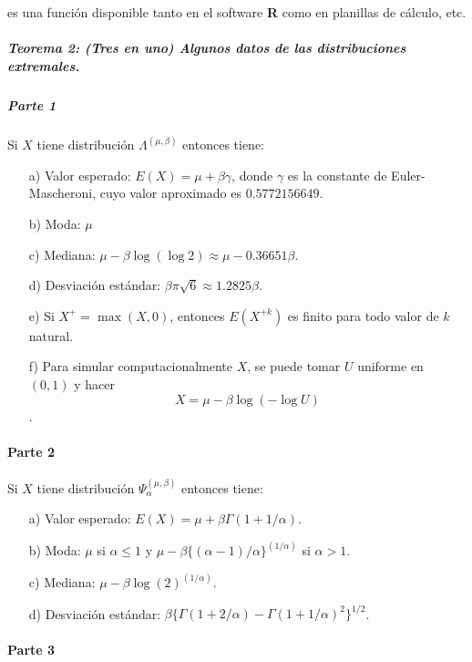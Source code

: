 \documentclass[
  oneside]{article}
\begin{document}
es una función disponible tanto en el software \textbf{R} como en
planillas de cálculo, etc.

\hypertarget{teorema-2-tres-en-uno-algunos-datos-de-las-distribuciones-extremales.}{%
\subparagraph{Teorema 2: (Tres en uno) Algunos datos de las
distribuciones
extremales.}\label{teorema-2-tres-en-uno-algunos-datos-de-las-distribuciones-extremales.}}

\hypertarget{parte-1}{%
\subparagraph{Parte 1}\label{parte-1}}

Si \(X\) tiene distribución \(\Lambda^{(\mu,\beta)}\) entonces tiene:

\begin{itemize}
  \item[a)] Valor esperado: $E(X) = \mu + \beta\gamma$, donde $\gamma$ es la constante de Euler-Mascheroni, cuyo valor aproximado es $0.5772156649$.
  \item[b)] Moda: $\mu$
  \item[c)] Mediana: $\mu - \beta \log(\log 2) \approx \mu - 0.36651 \beta$.
  \item[d)] Desviación estándar: $\beta \pi \sqrt{6} \approx 1.2825 \beta$.
  \item[e)] Si $X^+ = \max(X,0)$, entonces $E(X^{+k})$ es finito para todo valor de $k$ natural.
  \item[f)] Para simular computacionalmente $X$, se puede tomar $U$ uniforme en $(0,1)$ y hacer $$X = \mu - \beta \log(-\log U)$$.
\end{itemize}

\hypertarget{parte-2}{%
\paragraph{Parte 2}\label{parte-2}}

Si \(X\) tiene distribución \(\Psi_{\alpha}^{(\mu,\beta)}\) entonces
tiene:

\begin{itemize}
  \item[a)] Valor esperado: $E(X) = \mu + \beta\Gamma(1+1/\alpha)$.
  \item[b)] Moda: $\mu$ si $\alpha\leq 1$ y $\mu-\beta\{(\alpha-1)/\alpha\}^{(1/\alpha)}$ si $\alpha>1$.
  \item[c)] Mediana: $\mu - \beta \log(2)^{(1/\alpha)}$.
  \item[d)] Desviación estándar: $\beta\{\Gamma(1+2/\alpha)-\Gamma(1+1/\alpha)^2\}^{1/2}$.
\end{itemize}

\hypertarget{parte-3}{%
\paragraph{Parte 3}\label{parte-3}}
\end{document}
